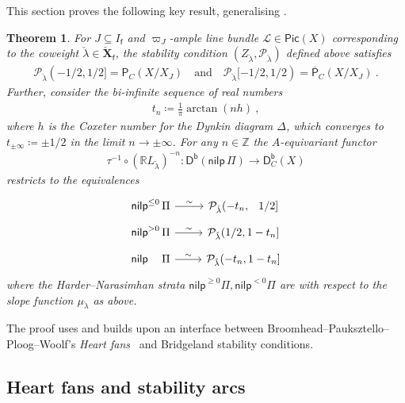 \documentclass[reqno,a4paper]{amsart}
\newcommand{\calL}{\mathcal{L}}
\newcommand{\calP}{\mathcal{P}}
\newcommand{\R}{\mathbb{R}}
\newcommand{\Z}{\mathbb{Z}}
\newcommand{\sff}{\mathsf{f}}
\newcommand{\bfX}{\mathbf{X}}
\newcommand{\half}{1/2}
\newcommand{\catPC}{\mathsf{P}_{C}}
\newcommand{\barcatPC}{\overline{\mathsf{P}}_{C}}
\newcommand{\nilpPi}{\mathsf{nilp}\, \Pi}
\newcommand{\nilp}{\mathsf{nilp}}
\newcommand{\catDb}{\mathsf{D}^\mathsf{b}}
\newcommand{\catDbC}{\mathsf{D}^\mathsf{b}_C}
\newcommand{\Llambda}{{\check{\lambda}}}
\newcommand{\weightlattice}{\bfX}
\newcommand{\coweightlattice}{\check{\weightlattice}}
\newcommand{\coweightlatticefin}{\coweightlattice_\sff}
\newcommand{\rsv}{X}
\newcommand{\psv}{X_J}
\newcommand{\Pic}{\mathsf{Pic}}
\theoremstyle{basic-theorem}
\newtheorem{theorem}{Theorem}[section]
\numberwithin{equation}{section}
\begin{document}
This section proves the following key result, generalising \cite[Theorem~\ref*{COHA-Yangian-thm:tau-slicing}--(\ref*{COHA-Yangian-thm:tau-slicing-2})]{DPSSV-3}.
\begin{theorem}\label{thm:slicing}
    For $J\subseteq I_\sff$ and $\varpi_J$-ample line bundle $\calL\in \Pic(\rsv)$ corresponding to the coweight $\Llambda\in \coweightlatticefin$, the
    stability condition $(Z_\Llambda,\calP_\Llambda)$ defined above satisfies
	\begin{align}	
   		\calP_\Llambda(-1/2, 1/2] = \catPC(\rsv/\psv)\quad\text{and}\quad\calP_\Llambda[-1/2,1/2)=\barcatPC(\rsv/\psv)\ .
	\end{align}
    Further, consider the bi-infinite sequence of real numbers 
    \begin{align}
    	t_n\coloneqq \frac{1}{\pi}\arctan(nh)\ ,
    \end{align}
	where $h$ is the Coxeter number for the Dynkin diagram $\Delta$, which converges to $t_{\pm\infty}\coloneqq\pm 1/2$ in the limit $n\to \pm \infty$. For any $n\in \Z$ the $A$-equivariant functor
    \begin{align}\label{eq:tk}
    	\tau^{-1}\circ (\R L_\Llambda)^{-n}\colon \catDb(\nilpPi)\longrightarrow \catDbC(\rsv)
    \end{align}
    restricts to the equivalences
	\begin{align}
		\begin{tikzcd}[ampersand replacement=\&, row sep=tiny]
            \nilp^{\leq 0}\,\Pi \ar{r}{\sim}\& \calP_\Llambda(-t_n,\phantom{-}\half] \\
			\nilp^{> 0}\,\Pi \ar{r}{\sim}\&\calP_\Llambda(\half,1-t_n] \\
            \nilp^{\phantom{<0}}\,\Pi\ar{r}{\sim}\&\calP_\Llambda(-t_n,1-t_n]
		\end{tikzcd}
	\end{align}
    where the Harder--Narasimhan strata $\nilp^{\geq 0}\Pi, \nilp^{<0}\Pi$ are with respect to the slope function $\mu_{\Llambda}$ as above.
\end{theorem}
The proof uses and builds upon an interface between
Broomhead--Pauksztello--Ploog--Woolf's \textit{Heart fans}~\cite{HeartFan} and
Bridgeland stability conditions.

\subsection{Heart fans and stability arcs}\label{subsec:stabilityarc}
\end{document}
